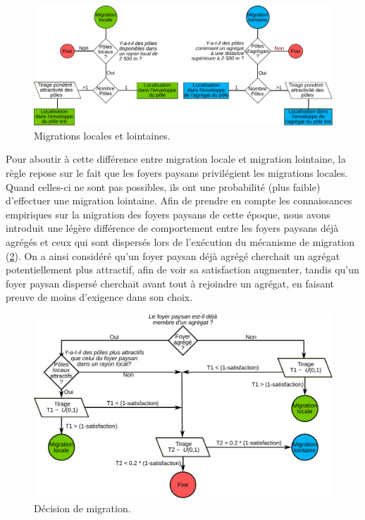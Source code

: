 \begin{figure}[H]
\centering
\includegraphics[width=1\linewidth]{img/migration_locale-lointaine.pdf}
\caption{Migrations locales et lointaines.}
\label{fig:migrations-locales-lointaines}
\end{figure}
Pour aboutir à cette différence entre migration locale et migration lointaine, la règle repose sur le fait que les foyers paysans privilégient les migrations locales.
Quand celles-ci ne sont pas possibles, ils ont une probabilité (plus faible) d'effectuer une migration lointaine.
Afin de prendre en compte les connaissances empiriques sur la migration des foyers paysans de cette époque, nous avons introduit une légère différence de comportement entre les foyers paysans déjà agrégés et ceux qui sont dispersés lors de l'exécution du mécanisme de migration (\cref{fig:choix-migration}).
On a ainsi considéré qu'un foyer paysan déjà agrégé cherchait un agrégat potentiellement plus attractif, afin de voir sa satisfaction augmenter, tandis qu'un foyer paysan dispersé cherchait avant tout à rejoindre un agrégat, en faisant preuve de moins d'exigence dans son choix.

\begin{figure}[H]
	\centering
	\includegraphics[width=0.9\linewidth]{img/choix_migration.pdf}
	\caption{Décision de migration.}
	\label{fig:choix-migration}
\end{figure}

